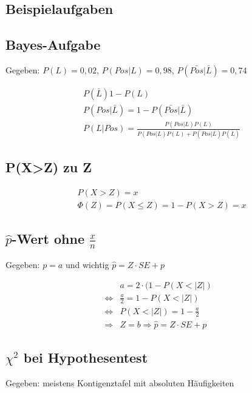 \documentclass[10pt,a4paper,landscape]{article}
\begin{document}
\begin{multicols}{4}

\section{Beispielaufgaben}

\subsection{Bayes-Aufgabe}
Gegeben: $P(L) = 0,02$, $P(Pos|L)=0,98$, $P(\bar{Pos}|\bar{L})=0,74$

\begin{align*}
& P (\bar{L}) 1 - P(L) \\
& P (Pos|\bar{L}) = 1 - P(\bar{Pos}|\bar{L}) \\
& P (L|Pos) = \frac{P(Pos|L)P(L)}{P(Pos|L)P(L)+P(Pos|\bar{L})P(\bar{L})}
\end{align*}

\subsection{P(X>Z) zu Z}
\begin{align*}
& P(X > Z) = x\\
& \Phi(Z) = P(X \leq Z) = 1- P(X > Z) = x
\end{align*}

\subsection{$\hat{p}$-Wert ohne $\frac{x}{n}$}
Gegeben: $p = a$ und wichtig $\hat{p} = Z \cdot SE + p$

\begin{align*}
& a = 2 \cdot (1 - P(X < |Z|) \\
\Leftrightarrow & \frac{a}{2} = 1 - P(X < |Z|) \\
\Leftrightarrow & P(X < |Z|) = 1 - \frac{a}{2} \\
\Rightarrow & Z = b \Rightarrow \hat{p} = Z \cdot SE +p
\end{align*}

\subsection{$\chi^2$ bei Hypothesentest}
Gegeben: meistens Kontigenztafel mit absoluten Häufigkeiten


\end{multicols}
\end{document}
